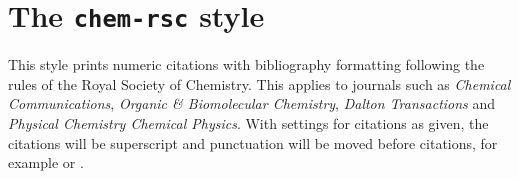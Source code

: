 \documentclass[a4paper]{article}
\begin{document}
\section*{The \texttt{chem-rsc} style}

This style prints numeric citations with bibliography
formatting following the rules of the Royal Society of
Chemistry.  This applies to journals such as \emph{Chemical
Communications}, \emph{Organic \& Biomolecular Chemistry},
\emph{Dalton Transactions} and \emph{Physical Chemistry
Chemical Physics}. With settings for citations as given, the
citations will be superscript and punctuation will be moved
before citations, for example \autocite{Kabbe1973} or
\autocite{Arduengo1991}.

\nocite{*}

\printbibliography
\end{document}
